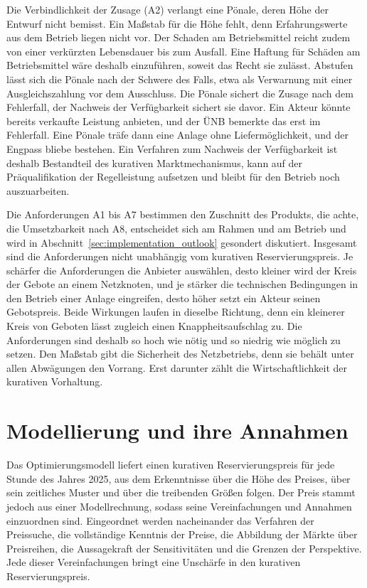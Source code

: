 Die Verbindlichkeit der Zusage (A2) verlangt eine Pönale, deren Höhe der Entwurf nicht bemisst.
Ein Maßstab für die Höhe fehlt, denn Erfahrungswerte aus dem Betrieb liegen nicht vor.
Der Schaden am Betriebsmittel reicht zudem von einer verkürzten Lebensdauer bis zum Ausfall.
Eine Haftung für Schäden am Betriebsmittel wäre deshalb einzuführen, soweit das Recht sie zulässt.
Abstufen lässt sich die Pönale nach der Schwere des Falls, etwa als Verwarnung mit einer Ausgleichszahlung vor dem Ausschluss.
Die Pönale sichert die Zusage nach dem Fehlerfall, der Nachweis der Verfügbarkeit sichert sie davor.
Ein Akteur könnte bereits verkaufte Leistung anbieten, und der \ac{ÜNB} bemerkte das erst im Fehlerfall.
Eine Pönale träfe dann eine Anlage ohne Liefermöglichkeit, und der Engpass bliebe bestehen.
Ein Verfahren zum Nachweis der Verfügbarkeit ist deshalb Bestandteil des kurativen Marktmechanismus, kann auf der Präqualifikation der Regelleistung aufsetzen und bleibt für den Betrieb noch auszuarbeiten.

Die Anforderungen A1 bis A7 bestimmen den Zuschnitt des Produkts, die achte, die Umsetzbarkeit nach A8, entscheidet sich am Rahmen und am Betrieb und wird in Abschnitt~\ref{sec:implementation_outlook} gesondert diskutiert.
Insgesamt sind die Anforderungen nicht unabhängig vom kurativen Reservierungspreis.
Je schärfer die Anforderungen die Anbieter auswählen, desto kleiner wird der Kreis der Gebote an einem Netzknoten, und je stärker die technischen Bedingungen in den Betrieb einer Anlage eingreifen, desto höher setzt ein Akteur seinen Gebotspreis.
Beide Wirkungen laufen in dieselbe Richtung, denn ein kleinerer Kreis von Geboten lässt zugleich einen Knappheitsaufschlag zu.
Die Anforderungen sind deshalb so hoch wie nötig und so niedrig wie möglich zu setzen.
Den Maßstab gibt die Sicherheit des Netzbetriebs, denn sie behält unter allen Abwägungen den Vorrang.
Erst darunter zählt die Wirtschaftlichkeit der kurativen Vorhaltung.

\section{Modellierung und ihre Annahmen}
\label{sec:model_discussion}

Das Optimierungsmodell liefert einen kurativen Reservierungspreis für jede Stunde des Jahres 2025, aus dem Erkenntnisse über die Höhe des Preises, über sein zeitliches Muster und über die treibenden Größen folgen.
Der Preis stammt jedoch aus einer Modellrechnung, sodass seine Vereinfachungen und Annahmen einzuordnen sind.
Eingeordnet werden nacheinander das Verfahren der Preissuche, die vollständige Kenntnis der Preise, die Abbildung der Märkte über Preisreihen, die Aussagekraft der Sensitivitäten und die Grenzen der Perspektive.
Jede dieser Vereinfachungen bringt eine Unschärfe in den kurativen Reservierungspreis.

